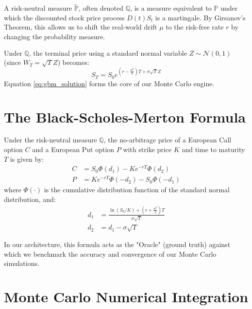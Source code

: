 \begin{definition}
A risk-neutral measure \(\tilde{\mathbb{P}}\), often denoted \(\mathbb{Q}\), is a measure equivalent to \(\mathbb{P}\) under which the discounted stock price process \(D(t)S_t\) is a martingale. By Girsanov's Theorem, this allows us to shift the real-world drift \(\mu\) to the risk-free rate \(r\) by changing the probability measure.
\end{definition}

Under \(\mathbb{Q}\), the terminal price using a standard normal variable \(Z \sim \mathcal{N}(0,1)\) (since \(W_T = \sqrt{T} Z\)) becomes:
\begin{equation}
    S_T = S_0 e^{\left( r - \frac{\sigma^2}{2} \right) T + \sigma \sqrt{T} Z}
    \label{eq:gbm_solution}
\end{equation}
Equation \ref{eq:gbm_solution} forms the core of our Monte Carlo engine.

\section{The Black-Scholes-Merton Formula}

\begin{theorem}
Under the risk-neutral measure \(\mathbb{Q}\), the no-arbitrage price of a European Call option \(C\) and a European Put option \(P\) with strike price \(K\) and time to maturity \(T\) is given by:
\begin{align}
    C &= S_0 \Phi(d_1) - K e^{-rT} \Phi(d_2) \\
    P &= K e^{-rT} \Phi(-d_2) - S_0 \Phi(-d_1)
\end{align}
where \(\Phi(\cdot)\) is the cumulative distribution function of the standard normal distribution, and:
\begin{align}
    d_1 &= \frac{\ln(S_0 / K) + \left( r + \frac{\sigma^2}{2} \right) T}{\sigma \sqrt{T}} \\
    d_2 &= d_1 - \sigma \sqrt{T}
\end{align}
\end{theorem}

\begin{remark}
    In our architecture, this formula acts as the "Oracle" (ground truth) against which we benchmark the accuracy and convergence of our Monte Carlo simulations.
\end{remark}

\section{Monte Carlo Numerical Integration}

